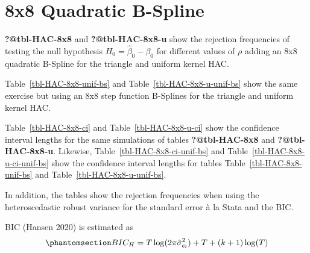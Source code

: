 \documentclass[
]{article}
\begin{document}
\section{8x8 Quadratic B-Spline}\label{sec-8x8}

\textbf{?@tbl-HAC-8x8} and \textbf{?@tbl-HAC-8x8-u} show the rejection
frequencies of testing the null hypothesis \(H_0=\hat\beta_0-\beta_0\)
for different values of \(\rho\) adding an 8x8 quadratic B-Spline for
the triangle and uniform kernel HAC.

Table~\ref{tbl-HAC-8x8-unif-bs} and Table~\ref{tbl-HAC-8x8-u-unif-bs}
show the same exercise but using an 8x8 step function B-Splines for the
triangle and uniform kernel HAC.

Table~\ref{tbl-HAC-8x8-ci} and Table~\ref{tbl-HAC-8x8-u-ci} show the
confidence interval lengths for the same simulations of tables
\textbf{?@tbl-HAC-8x8} and \textbf{?@tbl-HAC-8x8-u}. Likewise,
Table~\ref{tbl-HAC-8x8-ci-unif-bs} and
Table~\ref{tbl-HAC-8x8-u-ci-unif-bs} show the confidence interval
lengths for tables Table~\ref{tbl-HAC-8x8-unif-bs} and
Table~\ref{tbl-HAC-8x8-u-unif-bs}.

In addition, the tables show the rejection frequencies when using the
heteroscedastic robust variance for the standard error à la Stata and
the BIC.

BIC (Hansen 2020) is estimated as
\begin{equation}\phantomsection\label{eq-hansen-bic}{
BIC_H=T\log(2\pi\hat{\sigma}^2_{e_l})+T+(k+1)\log(T)
}\end{equation}
\end{document}
